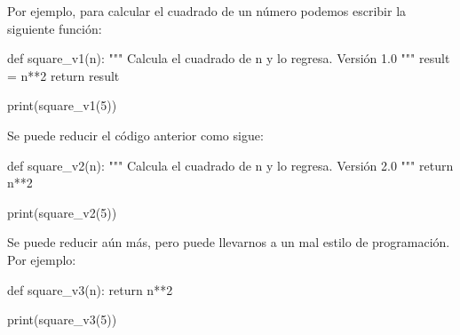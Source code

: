 \documentclass[
  letterpaper,
  DIV=11,
  numbers=noendperiod]{scrreprt}
\newenvironment{Shaded}{\begin{snugshade}}{\end{snugshade}}
\newcommand{\BuiltInTok}[1]{\textcolor[rgb]{0.00,0.23,0.31}{#1}}
\newcommand{\CommentTok}[1]{\textcolor[rgb]{0.37,0.37,0.37}{#1}}
\newcommand{\ControlFlowTok}[1]{\textcolor[rgb]{0.00,0.23,0.31}{#1}}
\newcommand{\DecValTok}[1]{\textcolor[rgb]{0.68,0.00,0.00}{#1}}
\newcommand{\KeywordTok}[1]{\textcolor[rgb]{0.00,0.23,0.31}{#1}}
\newcommand{\NormalTok}[1]{\textcolor[rgb]{0.00,0.23,0.31}{#1}}
\newcommand{\OperatorTok}[1]{\textcolor[rgb]{0.37,0.37,0.37}{#1}}
\begin{document}
Por ejemplo, para calcular el cuadrado de un número podemos escribir la
siguiente función:

\begin{Shaded}
\begin{Highlighting}[]
\KeywordTok{def}\NormalTok{ square\_v1(n):}
    \CommentTok{"""}
\CommentTok{    Calcula el cuadrado de n y lo regresa. Versión 1.0}
\CommentTok{    """}
\NormalTok{    result }\OperatorTok{=}\NormalTok{ n}\OperatorTok{**}\DecValTok{2}
    \ControlFlowTok{return}\NormalTok{ result}
\end{Highlighting}
\end{Shaded}

\begin{Shaded}
\begin{Highlighting}[]
\BuiltInTok{print}\NormalTok{(square\_v1(}\DecValTok{5}\NormalTok{))}
\end{Highlighting}
\end{Shaded}

Se puede reducir el código anterior como sigue:

\begin{Shaded}
\begin{Highlighting}[]
\KeywordTok{def}\NormalTok{ square\_v2(n):}
    \CommentTok{"""}
\CommentTok{    Calcula el cuadrado de n y lo regresa. Versión 2.0}
\CommentTok{    """}
    \ControlFlowTok{return}\NormalTok{ n}\OperatorTok{**}\DecValTok{2}
\end{Highlighting}
\end{Shaded}

\begin{Shaded}
\begin{Highlighting}[]
\BuiltInTok{print}\NormalTok{(square\_v2(}\DecValTok{5}\NormalTok{))}
\end{Highlighting}
\end{Shaded}

Se puede reducir aún más, pero puede llevarnos a un mal estilo de
programación. Por ejemplo:

\begin{Shaded}
\begin{Highlighting}[]
\KeywordTok{def}\NormalTok{ square\_v3(n): }\ControlFlowTok{return}\NormalTok{ n}\OperatorTok{**}\DecValTok{2}
\end{Highlighting}
\end{Shaded}

\begin{Shaded}
\begin{Highlighting}[]
\BuiltInTok{print}\NormalTok{(square\_v3(}\DecValTok{5}\NormalTok{))}
\end{Highlighting}
\end{Shaded}
\end{document}
